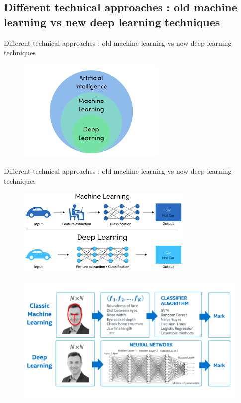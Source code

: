 \documentclass[tikz,table,border=2mm]{beamer}
\begin{document}
\subsection{Different technical approaches : old machine learning vs new deep learning techniques}
\begin{frame}{Different technical approaches : old machine learning vs new deep learning techniques}
    \begin{figure}
    \includegraphics[width=0.6\linewidth]{images/ml_vs-dl_2.png}
    \end{figure}
\end{frame}
\begin{frame}{Different technical approaches : old machine learning vs new deep learning techniques}
    \begin{figure}
    \includegraphics[width=0.5\linewidth]{images/ml_vs-dl_1.png}
    \end{figure}
    \begin{figure}
    \includegraphics[width=0.5\linewidth]{images/ml_vs_dl_1.png}
    \end{figure}
\end{frame}
\end{document}

